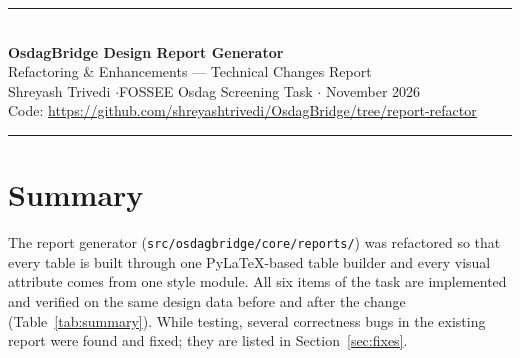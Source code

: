 \documentclass[11pt,a4paper]{article}
\newcommand{\code}[1]{\texttt{\small #1}}
\begin{document}
\begin{center}
{\color{osdag}\rule{\linewidth}{1.2pt}}\\[8pt]
{\LARGE\sffamily\bfseries OsdagBridge Design Report Generator}\\[4pt]
{\Large\sffamily Refactoring \& Enhancements --- Technical Changes Report}\\[10pt]
{\normalsize Shreyash Trivedi \quad$\cdot$\quad FOSSEE Osdag Screening Task \quad$\cdot$ November 2026}\\[4pt]
{\small Code: \url{https://github.com/shreyashtrivedi/OsdagBridge/tree/report-refactor}}\\[6pt]
{\color{osdag}\rule{\linewidth}{1.2pt}}
\end{center}

\section{Summary}

The report generator (\code{src/osdagbridge/core/reports/}) was refactored so that every table is
built through one PyLaTeX-based table builder and every visual attribute comes from one style
module. All six items of the task are implemented and verified on the same design data before and
after the change (Table~\ref{tab:summary}). While testing, several correctness bugs in the existing
report were found and fixed; they are listed in Section~\ref{sec:fixes}.
\end{document}

